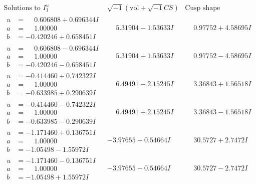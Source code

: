 \documentclass[1p]{elsarticle_modified}
\theoremstyle{definition}
\newcommand{\I}{\sqrt{-1}}
\begin{document}
$$\begin{array}{c|c|c}  
\text{Solutions to }I^u_{1}& \I (\text{vol} + \sqrt{-1}CS) & \text{Cusp shape}\\
 \hline 
\begin{aligned}
u &= \phantom{-}0.606808 + 0.696344 I \\
a &= \phantom{-}1.00000\phantom{ +0.000000I} \\
b &= -0.420246 + 0.658451 I\end{aligned}
 & \phantom{-}5.31904 - 1.53633 I & \phantom{-}0.97752 + 4.58695 I \\ \hline\begin{aligned}
u &= \phantom{-}0.606808 - 0.696344 I \\
a &= \phantom{-}1.00000\phantom{ +0.000000I} \\
b &= -0.420246 - 0.658451 I\end{aligned}
 & \phantom{-}5.31904 + 1.53633 I & \phantom{-}0.97752 - 4.58695 I \\ \hline\begin{aligned}
u &= -0.414460 + 0.742322 I \\
a &= \phantom{-}1.00000\phantom{ +0.000000I} \\
b &= -0.633985 + 0.290639 I\end{aligned}
 & \phantom{-}6.49491 - 2.15245 I & \phantom{-}3.36843 + 1.56518 I \\ \hline\begin{aligned}
u &= -0.414460 - 0.742322 I \\
a &= \phantom{-}1.00000\phantom{ +0.000000I} \\
b &= -0.633985 - 0.290639 I\end{aligned}
 & \phantom{-}6.49491 + 2.15245 I & \phantom{-}3.36843 - 1.56518 I \\ \hline\begin{aligned}
u &= -1.171460 + 0.136751 I \\
a &= \phantom{-}1.00000\phantom{ +0.000000I} \\
b &= -1.05498 - 1.55972 I\end{aligned}
 & -3.97655 + 0.54664 I & \phantom{-}30.5727 + 2.7472 I \\ \hline\begin{aligned}
u &= -1.171460 - 0.136751 I \\
a &= \phantom{-}1.00000\phantom{ +0.000000I} \\
b &= -1.05498 + 1.55972 I\end{aligned}
 & -3.97655 - 0.54664 I & \phantom{-}30.5727 - 2.7472 I \\ \hline\begin{aligned}

\end{aligned}
\end{array}$$
\end{document}
